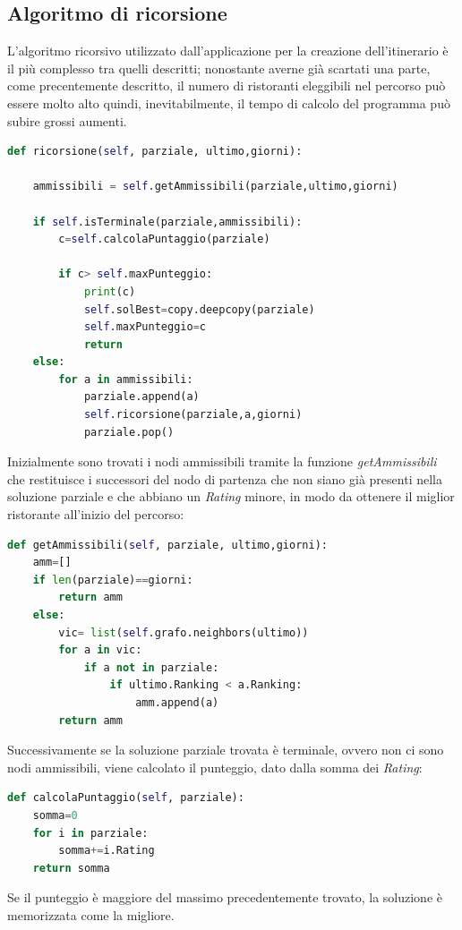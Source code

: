 \documentclass{report}
\begin{document}
\subsection{Algoritmo di ricorsione}\label{sec2_ricorsione}
L'algoritmo ricorsivo utilizzato dall'applicazione per la creazione dell'itinerario è il più complesso tra quelli descritti; nonostante averne già scartati una parte, come precentemente descritto, il numero di ristoranti eleggibili nel percorso può essere molto alto quindi, inevitabilmente, il tempo di calcolo del programma può subire grossi aumenti.
\label{codice_ricorsione}
\begin{lstlisting}[language=Python,caption=Ricorsione per ricavare migliore itinerario]
def ricorsione(self, parziale, ultimo,giorni):
  
    ammissibili = self.getAmmissibili(parziale,ultimo,giorni)

    if self.isTerminale(parziale,ammissibili):
        c=self.calcolaPuntaggio(parziale)

        if c> self.maxPunteggio:
            print(c)
            self.solBest=copy.deepcopy(parziale)
            self.maxPunteggio=c
            return
    else:
        for a in ammissibili:
            parziale.append(a)
            self.ricorsione(parziale,a,giorni)
            parziale.pop()
\end{lstlisting}

Inizialmente sono trovati i nodi ammissibili tramite la funzione \textit{getAmmissibili} che restituisce i successori del nodo di partenza che non siano già presenti nella soluzione parziale e che abbiano un \textit{Rating} minore, in modo da ottenere il miglior ristorante all'inizio del percorso:
\begin{lstlisting}[language=Python,caption=Funzione che restituisce i nodi ammissibili nella soluzione parziale]
def getAmmissibili(self, parziale, ultimo,giorni):
    amm=[]
    if len(parziale)==giorni:
        return amm
    else:
        vic= list(self.grafo.neighbors(ultimo))
        for a in vic:
            if a not in parziale:
                if ultimo.Ranking < a.Ranking:
                    amm.append(a)
        return amm
\end{lstlisting}

Successivamente se la soluzione parziale trovata è terminale, ovvero non ci sono nodi ammissibili, viene calcolato il punteggio, dato dalla somma dei \textit{Rating}:
\begin{lstlisting}[language=Python,caption=Funzione per il calcolo del punteggio]
def calcolaPuntaggio(self, parziale):
    somma=0
    for i in parziale:
        somma+=i.Rating
    return somma
\end{lstlisting}
Se il punteggio è maggiore del massimo precedentemente trovato, la soluzione è memorizzata come la migliore.
\end{document}

